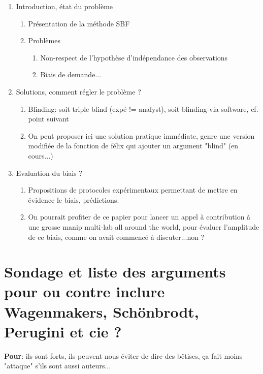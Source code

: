 \documentclass[a4paper,man,natbib]{apa6}
\begin{document}
\renewcommand{\labelenumii}{\Roman{enumii}}
\begin{enumerate}
	\item{Introduction, état du problème}
	\begin{enumerate}
		\item{Présentation de la méthode SBF}
		\item{Problèmes}
			\begin{enumerate}
            \item{Non-respect de l'hypothèse d'indépendance des observations}
            \item{Biais de demande...}
            \end{enumerate}
            \end{enumerate}
            \item{Solutions, comment régler le problème ?}
            \begin{enumerate}
            \item{Blinding: soit triple blind (expé != analyst), soit blinding via software, cf. point suivant}
            \item{On peut proposer ici une solution pratique immédiate, genre une version modifiée de la fonction de félix qui ajouter un argument "blind" (en cours...)}
            \end{enumerate}
            \item{Evaluation du biais ?}
            \begin{enumerate}
            \item{Propositions de protocoles expérimentaux permettant de mettre en évidence le biais, prédictions.}
            \item{On pourrait profiter de ce papier pour lancer un appel à contribution à une grosse manip multi-lab all around the world, pour évaluer l'amplitude de ce biais, comme on avait commencé à discuter...non ?}

\end{enumerate}
\end{enumerate}


\section{Sondage et liste des arguments pour ou contre inclure Wagenmakers, Schönbrodt, Perugini et cie ?}

\textbf{Pour}: ils sont forts, ils peuvent nous éviter de dire des bêtises, ça fait moins "attaque" s'ils sont aussi auteurs...
\end{document}
